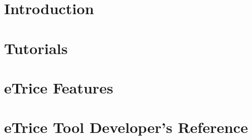 \documentclass[a4paper,oneside,10pt]{book}
\title{\Huge \eTrice}
\author{\eTrice{} committers and contributors}
\begin{document}
\maketitle

\tableofcontents

\chapter{Introduction}




\chapter{Tutorials}











\chapter{eTrice{} Features}


%
%
%



\chapter{eTrice{} Tool Developer's Reference}


\end{document}
